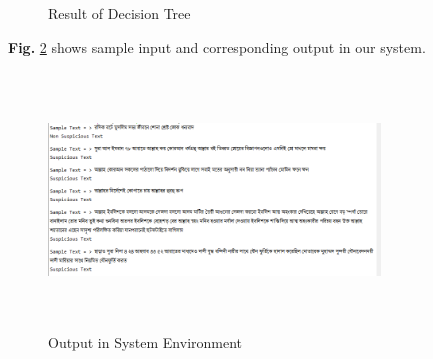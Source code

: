 \begin{figure}[H]
\centering
{}%
\hfill %
%
\caption{Result of Decision Tree}
\label{fdct}
\end{figure}

\textbf{Fig.} \ref{fig:out} shows sample input and corresponding output in our system.
\begin{figure}[h!]
\centering
  \includegraphics[height=6.8cm, width=8.8cm]{Figures/output.PNG}
  \caption{ Output in System Environment}
  \label{fig:out}
\end{figure}